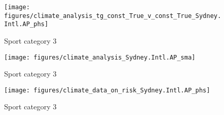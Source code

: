 \documentclass[11pt]{article}
\begin{document}
    \begin{figure}[htb!]
        \centering
        \texttt{[image: figures/climate\_analysis\_tg\_const\_True\_v\_const\_True\_Sydney.Intl.AP\_phs]}
        \caption{Sport category 3}
    \end{figure}
    \begin{figure}[htb!]
            \centering
            \texttt{[image: figures/climate\_analysis\_Sydney.Intl.AP\_sma]}
            \caption{Sport category 3}
        \end{figure}
    \begin{figure}[htb!]
            \centering
            \texttt{[image: figures/climate\_data\_on\_risk\_Sydney.Intl.AP\_phs]}
            \caption{Sport category 3}
        \end{figure}
%
%
\end{document}
